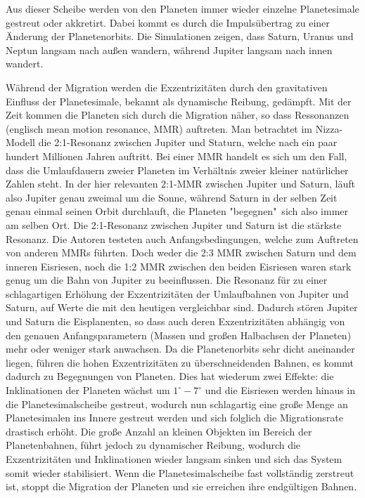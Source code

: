 \documentclass[10pt,a4paper,twoside]{article}
\begin{document}
Aus dieser Scheibe werden von den Planeten immer wieder einzelne Planetesimale gestreut oder akkretirt. Dabei kommt es durch die Impulsübertrag zu einer Änderung der Planetenorbits\cite{Tsiganis2005}. %
Die Simulationen zeigen, dass Saturn, Uranus und Neptun langsam nach außen wandern, während Jupiter langsam nach innen wandert\cite{Tsiganis2005}\cite{Hahn1999}. %

Während der Migration werden die Exzentrizitäten durch den gravitativen Einfluss der Planetesimale, bekannt als dynamische Reibung, gedämpft.\cite{Tsiganis2005}
Mit der Zeit kommen die Planeten sich durch die Migration näher, so dass Ressonanzen (englisch mean motion resonance, MMR) auftreten.
Man betrachtet im Nizza-Modell die 2:1-Resonanz zwischen Jupiter und Staturn, welche nach ein paar hundert Millionen Jahren auftritt.
Bei einer MMR handelt es sich um den Fall, dass die Umlaufdauern zweier Planeten im Verhältnis zweier kleiner natürlicher Zahlen steht. In der hier relevanten 2:1-MMR zwischen Jupiter und Saturn, läuft also Jupiter genau zweimal um die Sonne, während Saturn in der selben Zeit genau einmal seinen Orbit durchlauft, die Planeten "begegnen"\ sich also immer am selben Ort. %
Die 2:1-Resonanz zwischen Jupiter und Saturn ist die stärkste Resonanz. %
Die Autoren testeten auch Anfangsbedingungen, welche zum Auftreten von anderen MMRs führten. Doch weder die 2:3 MMR zwischen Saturn und dem inneren Eisriesen, noch die 1:2 MMR zwischen den beiden Eisriesen waren stark genug um die Bahn von Jupiter zu beeinflussen\cite{Tsiganis2005}. %
Die Resonanz für zu einer schlagartigen Erhöhung der Exzentrizitäten der Umlaufbahnen von Jupiter und Saturn, auf Werte die mit den heutigen vergleichbar sind. %
Dadurch stören Jupiter und Saturn die Eisplanenten, so dass auch deren Exzentrizitäten abhängig von den genauen Anfangsparametern (Massen und großen Halbachsen der Planeten) mehr oder weniger stark anwachsen\cite{Tsiganis2005}.
Da die Planetenorbits sehr dicht aneinander liegen, führen die hohen Exzentrizitäten zu überschneidenden Bahnen\cite{Tsiganis2005}, es kommt dadurch zu Begegnungen von Planeten. %
Dies hat wiederum zwei Effekte: die Inklinationen der Planeten wächst um $1^\circ-7^\circ$ und die Eisriesen werden hinaus in die Planetesimalscheibe gestreut,
wodurch nun schlagartig eine große Menge an Planetesimalen ins Innere gestreut werden und sich folglich die Migrationsrate drastisch erhöht\cite{Tsiganis2005}.
Die große Anzahl an kleinen Objekten im Bereich der Planetenbahnen, führt jedoch zu dynamischer Reibung, wodurch die Exzentrizitäten und Inklinationen wieder langsam sinken und sich das System somit wieder stabilisiert\cite{Tsiganis2005}.
Wenn die Planetesimalscheibe fast vollständig zerstreut ist, stoppt die Migration der Planeten und sie erreichen ihre endgültigen Bahnen\cite{Tsiganis2005}.
\end{document}
